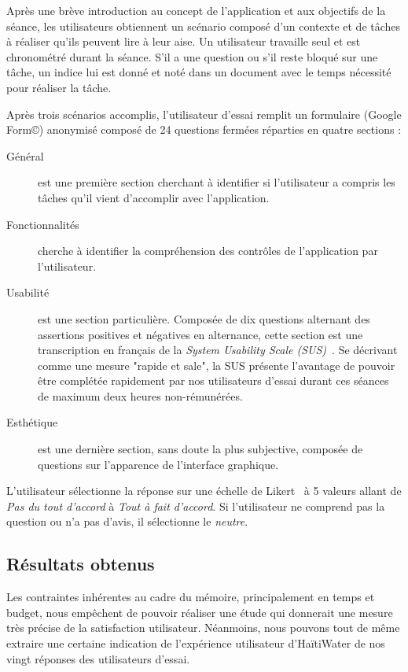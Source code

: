 \documentclass{EPL-master-thesis-covers-FR}
\begin{document}
				Après une brève introduction au concept de l'application et aux objectifs de la séance, les utilisateurs obtiennent un scénario composé d'un contexte et de tâches à réaliser qu'ils peuvent lire à leur aise. Un utilisateur travaille seul et est chronométré durant la séance. S'il a une question ou s'il reste bloqué sur une tâche, un indice lui est donné et noté dans un document avec le temps nécessité pour réaliser la tâche.

				Après trois scénarios accomplis, l'utilisateur d'essai remplit un formulaire (Google Form\copyright) anonymisé composé de 24 questions fermées réparties en quatre sections :
				\begin{description}
					\item[Général] est une première section cherchant à identifier si l'utilisateur a compris les tâches qu'il vient d'accomplir avec l'application.
					\item[Fonctionnalités] cherche à identifier la compréhension des contrôles de l'application par l'utilisateur.
					\item[Usabilité] est une section particulière. Composée de dix questions alternant des assertions positives et négatives en alternance, cette section est une transcription en français de la \emph{System Usability Scale (SUS)}~\cite{ref:sus}. Se décrivant comme une mesure "rapide et sale", la SUS présente l'avantage de pouvoir être complétée rapidement par nos utilisateurs d'essai durant ces séances de maximum deux heures non-rémunérées.
					\item[Esthétique] est une dernière section, sans doute la plus subjective, composée de questions sur l'apparence de l'interface graphique.
				\end{description}

				L'utilisateur sélectionne la réponse sur une échelle de Likert~\cite{ref:wikipedia_likert_scale} à 5 valeurs allant de \emph{Pas du tout d'accord} à \emph{Tout à fait d'accord}. Si l'utilisateur ne comprend pas la question ou n'a pas d'avis, il sélectionne le \emph{neutre}.

			\subsection*{Résultats obtenus}

				Les contraintes inhérentes au cadre du mémoire, principalement en temps et budget, nous empêchent de pouvoir réaliser une étude qui donnerait une mesure très précise de la satisfaction utilisateur. Néanmoins, nous pouvons tout de même extraire une certaine indication de l'expérience utilisateur d'HaïtiWater de nos vingt réponses des utilisateurs d'essai.
\end{document}
